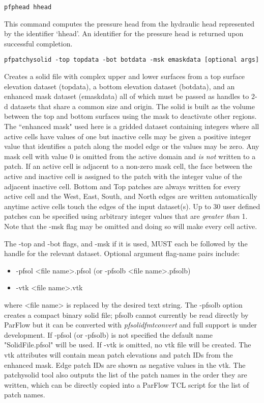 \begin{description}
\item{\begin{verbatim}pfphead hhead\end{verbatim}}
This command computes the pressure head from the hydraulic head
represented by the identifier `hhead'.  An identifier for the pressure
head is returned upon successful completion.

\item{\begin{verbatim}pfpatchysolid -top topdata -bot botdata -msk emaskdata [optional args] \end{verbatim}}
Creates a solid file with complex upper and lower surfaces from a top surface elevation dataset (topdata), a bottom elevation dataset (botdata), and an enhanced mask dataset (emaskdata) all of which must be passed as handles to 2-d datasets that share a common size and origin. The solid is built as the volume between the top and bottom surfaces using the mask to deactivate other regions. The ``enhanced mask" used here is a gridded dataset containing integers where all
active cells have values of one but inactive cells may be given a positive integer value that identifies
a patch along the model edge or the values may be zero. Any mask cell with value 0 is omitted from the active domain and \textit{is not} written to a patch.
If an active cell is adjacent to a non-zero mask cell, the face between the active and inactive cell is assigned to the
patch with the integer value of the adjacent inactive cell. Bottom and Top patches are always written for every active cell and the West, East, South, and North
edges are written automatically anytime active cells touch the edges of the input dataset(s). Up to 30 user defined patches can be specified using arbitrary integer values that are \textit{greater than} 1.
Note that the -msk flag may be omitted and doing so will make every cell active.

The -top and -bot flags, and -msk if it is used, MUST
each be followed by the handle for the relevant dataset. Optional argument flag-name pairs include:
\begin{itemize}
\item{-pfsol} <file name>.pfsol  (or -pfsolb <file name>.pfsolb)
\item{-vtk} <file name>.vtk
\end{itemize}

where <file name> is replaced by the desired text string. The -pfsolb option creates a compact binary solid file; pfsolb cannot currently be read directly by ParFlow but it can be converted with \textit{pfsolidfmtconvert} and full support is under development. If -pfsol (or -pfsolb) is not specified the
default name "SolidFile.pfsol" will be used. If -vtk is omitted, no vtk file will be created. The vtk attributes will contain mean patch elevations and patch IDs from the enhanced mask. Edge patch IDs are shown as negative values in the vtk.
The patchysolid tool also outputs the list of the patch names in the order they are written, which can be directly copied into a ParFlow TCL script for the list of patch names.


\end{description}
